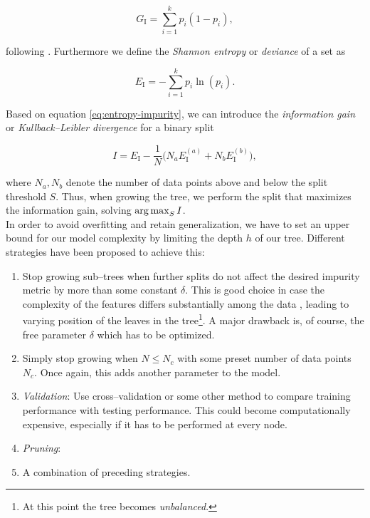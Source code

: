 \begin{equation}
\label{eq:gini-impurity}
G_{\text{I}} = \sum\limits_{i=1}^k p_i (1 - p_i),
\end{equation}

following \citet{astroML,hastie2001,ripley2007}. Furthermore we define the \emph{Shannon entropy} or \emph{deviance} of a set as

\begin{equation}
\label{eq:entropy-impurity}
E_{\text{I}} = - \sum\limits_{i=1}^k p_i \ln(p_i).
\end{equation}

Based on equation \eqref{eq:entropy-impurity}, we can introduce the \emph{information gain} or \emph{Kullback--Leibler divergence} \citep{kullback1951} for a binary split

\begin{equation}
\label{eq:information-gain}
I = E_{\text{I}} - \frac{1}{N} \big(N_a E_{\text{I}}^{(a)} + N_b E_{\text{I}}^{(b)}\big),
\end{equation}

where $N_a, N_b$ denote the number of data points above and below the split threshold $S$. Thus, when growing the tree, we perform the split that maximizes the information gain, \ie solving $\operatorname*{arg\,max}_S I$.\\

In order to avoid overfitting and retain generalization, we have to set an upper bound for our model complexity by limiting the depth $h$ of our tree. Different strategies have been proposed to achieve this:

\begin{enumerate}
\item \label{itm:constant-metric} Stop growing sub--trees when further splits do not affect the desired impurity metric by more than some constant $\delta$. This is good choice in case the complexity of the features differs substantially among the data \citep{duda2001}, leading to varying position of the leaves in the tree\footnote{At this point the tree becomes \emph{unbalanced}.}. A major drawback is, of course, the free parameter $\delta$ which has to be optimized.
\item \label{itm:constant-data-points} Simply stop growing when $N \le N_c$ with some preset number of data points $N_c$. Once again, this adds another parameter to the model.
\item \label{itm:validation} \emph{Validation}: Use cross--validation or some other method to compare training performance with testing performance. This could become computationally expensive, especially if it has to be performed at every node.
\item \label{itm:pruning} \emph{Pruning}:
\item A combination of preceding strategies.
\end{enumerate}

